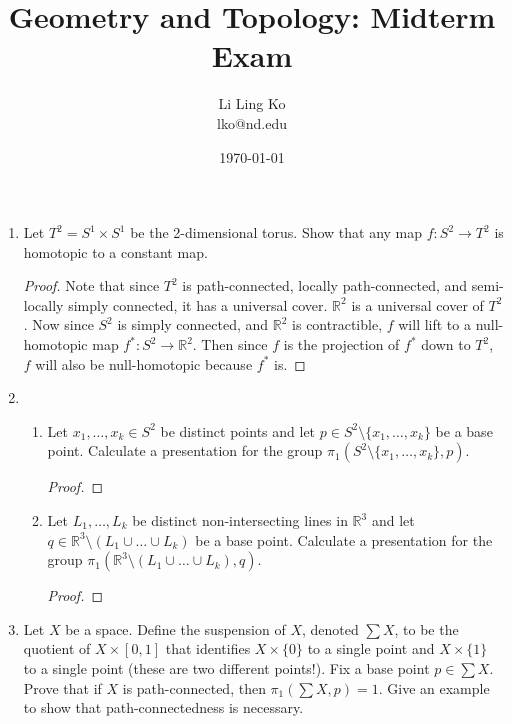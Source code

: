 \documentclass{article}
\begin{document}
\title{Geometry and Topology: Midterm Exam}
\author{Li Ling Ko\\ lko@nd.edu}
\date{\today}
\maketitle

\begin{enumerate}[label={\bf Q\arabic*:}]
  \item Let $T^2=S^1\times S^1$ be the 2-dimensional torus. Show that any
    map $f:S^2\rightarrow T^2$ is homotopic to a constant map.
    \begin{proof}
      Note that since $T^2$ is path-connected, locally path-connected, and
      semi-locally simply connected, it has a universal cover.
      $\mathbb{R}^2$ is a universal cover of $T^2$. Now since $S^2$ is
      simply connected, and $\mathbb{R}^2$ is contractible, $f$ will lift
      to a null-homotopic map $f^*:S^2\rightarrow\mathbb{R}^2$. Then since
      $f$ is the projection of $f^*$ down to $T^2$, $f$ will also be
      null-homotopic because $f^*$ is.
    \end{proof}

  \item
    \begin{enumerate}
      \item Let $x_1,\ldots,x_k\in S^2$ be distinct points and let $p\in
        S^2\setminus\{x_1,\ldots,x_k\}$ be a base point. Calculate a
        presentation for the group
        $\pi_1(S^2\setminus\{x_1,\ldots,x_k\},p)$.

        \begin{proof}
        \end{proof}

      \item Let $L_1,\ldots,L_k$ be distinct non-intersecting lines in
        $\mathbb{R}^3$ and let $q\in\mathbb{R}^3\setminus(L_1\cup\ldots\cup
        L_k)$ be a base point. Calculate a presentation for the group
        $\pi_1(\mathbb{R}^3\setminus(L_1\cup\ldots\cup L_k),q)$.

        \begin{proof}
        \end{proof}
    \end{enumerate}

  \item Let $X$ be a space. Define the suspension of $X$, denoted $\sum X$,
    to be the quotient of $X\times[0,1]$ that identifies $X\times\{0\}$ to
    a single point and $X\times\{1\}$ to a single point (these are two
    different points!). Fix a base point $p\in\sum X$. Prove that if $X$ is
    path-connected, then $\pi_1(\sum X,p)=1$. Give an example to show that
    path-connectedness is necessary. 


\end{enumerate}
\end{document}
